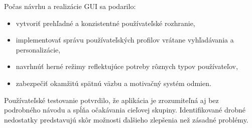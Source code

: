 \documentclass[a4paper,12pt]{article}
\begin{document}
Počas návrhu a realizácie GUI sa podarilo:
\begin{itemize}
    \item vytvoriť prehľadné a konzistentné používateľské rozhranie,
    \item implementovať správu používateľských profilov vrátane vyhľadávania a personalizácie,
    \item navrhnúť herné režimy reflektujúce potreby rôznych typov používateľov,
    \item zabezpečiť okamžitú spätnú väzbu a motivačný systém odmien.
\end{itemize}

Používateľské testovanie potvrdilo, že aplikácia je zrozumiteľná aj bez podrobného návodu a spĺňa očakávania cieľovej skupiny. Identifikované drobné nedostatky predstavujú skôr možnosti ďalšieho zlepšenia než zásadné problémy.



    
    
\end{document}
